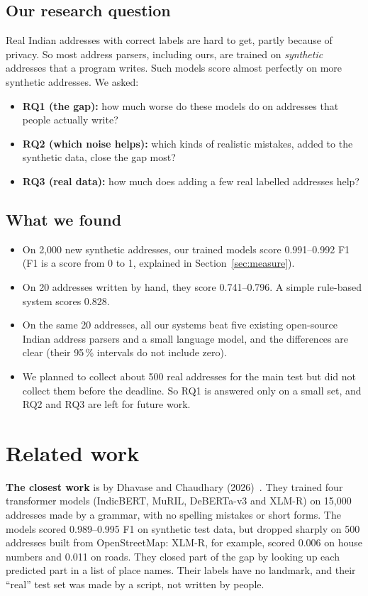 \documentclass[11pt,a4paper]{article}
\begin{document}
\subsection{Our research question}
Real Indian addresses with correct labels are hard to get, partly because of privacy. So most address parsers,
including ours, are trained on \emph{synthetic} addresses that a program writes. Such models score almost perfectly on
more synthetic addresses. We asked:
\begin{itemize}
\item \textbf{RQ1 (the gap):} how much worse do these models do on addresses that people actually write?
\item \textbf{RQ2 (which noise helps):} which kinds of realistic mistakes, added to the synthetic data, close the
gap most?
\item \textbf{RQ3 (real data):} how much does adding a few real labelled addresses help?
\end{itemize}

\subsection{What we found}
\begin{itemize}
\item On 2,000 new synthetic addresses, our trained models score 0.991--0.992 F1 (F1 is a score from 0 to 1,
explained in Section~\ref{sec:measure}).
\item On 20 addresses written by hand, they score 0.741--0.796. A simple rule-based system scores 0.828.
\item On the same 20 addresses, all our systems beat five existing open-source Indian address parsers and a small
language model, and the differences are clear (their 95\,\% intervals do not include zero).
\item We planned to collect about 500 real addresses for the main test but did not collect them before the
deadline. So RQ1 is answered only on a small set, and RQ2 and RQ3 are left for future work.
\end{itemize}

\section{Related work}
\textbf{The closest work} is by Dhavase and Chaudhary (2026)~\cite{etasr}. They trained four transformer models
(IndicBERT, MuRIL, DeBERTa-v3 and \mbox{XLM-R}) on 15,000 addresses made by a grammar, with no spelling mistakes or short
forms. The models scored 0.989--0.995 F1 on synthetic test data, but dropped sharply on 500 addresses built from
OpenStreetMap: \mbox{XLM-R}, for example, scored 0.006 on house numbers and 0.011 on roads. They closed part of the gap by
looking up each predicted part in a list of place names. Their labels have no landmark, and their ``real'' test set
was made by a script, not written by people.
\end{document}
